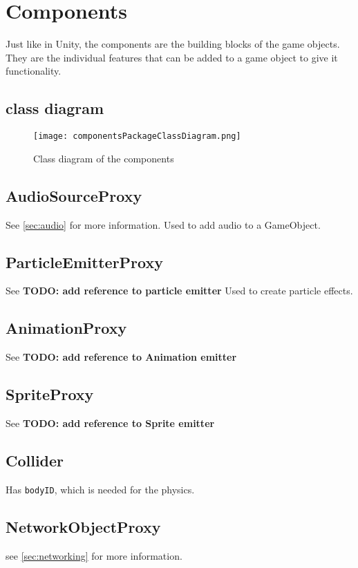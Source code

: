 \section{Components}
\label{sec:components}
Just like in Unity, the components are the building blocks of the game objects.
They are the individual features that can be added to a game object to give it functionality.

\subsection{class diagram}
\begin{figure}[H]
    \texttt{[image: componentsPackageClassDiagram.png]}
    \caption{Class diagram of the components}
    \label{fig:components}
\end{figure}

\subsection{AudioSourceProxy}
See \autoref{sec:audio} for more information.
Used to add audio to a GameObject.

\subsection{ParticleEmitterProxy}
See \textbf{TODO: add reference to particle emitter}
Used to create particle effects.

\subsection{AnimationProxy}
See \textbf{TODO: add reference to Animation emitter}

\subsection{SpriteProxy}
See \textbf{TODO: add reference to Sprite emitter}

\subsection{Collider}
Has \texttt{bodyID}, which is needed for the physics.

\subsection{NetworkObjectProxy}
see \autoref{sec:networking} for more information.

